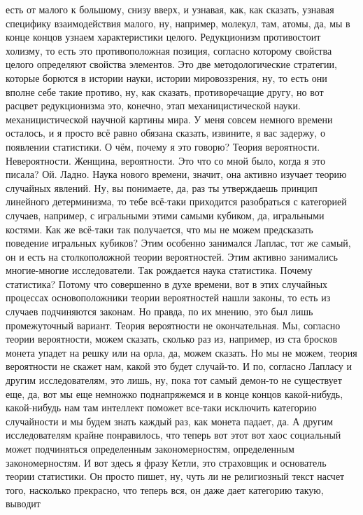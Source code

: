 есть от малого к большому, снизу вверх, и узнавая, как, как сказать, узнавая
специфику взаимодействия малого, ну, например, молекул, там, атомы, да, мы в
конце концов узнаем характеристики целого. Редукционизм противостоит холизму, то
есть это противоположная позиция, согласно которому свойства целого определяют
свойства элементов. Это две методологические стратегии, которые борются в
истории науки, истории мировоззрения, ну, то есть они вполне себе такие противо,
ну, как сказать, противоречащие другу, но вот расцвет редукционизма это,
конечно, этап механицистической науки. механицистической научной картины мира. У
меня совсем немного времени осталось, и я просто всё равно обязана сказать,
извините, я вас задержу, о появлении статистики. О чём, почему я это говорю?
Теория вероятности. Невероятности. Женщина, вероятности. Это что со мной было,
когда я это писала? Ой. Ладно. Наука нового времени, значит, она активно изучает
теорию случайных явлений. Ну, вы понимаете, да, раз ты утверждаешь принцип
линейного детерминизма, то тебе всё-таки приходится разобраться с категорией
случаев, например, с игральными этими самыми кубиком, да, игральными костями.
Как же всё-таки так получается, что мы не можем предсказать поведение игральных
кубиков? Этим особенно занимался Лаплас, тот же самый, он и есть на
столкоположной теории вероятностей. Этим активно занимались многие-многие
исследователи. Так рождается наука статистика. Почему статистика? Потому что
совершенно в духе времени, вот в этих случайных процессах основоположники теории
вероятностей нашли законы, то есть из случаев подчиняются законам. Но правда, по
их мнению, это был лишь промежуточный вариант. Теория вероятности не
окончательная. Мы, согласно теории вероятности, можем сказать, сколько раз из,
например, из ста бросков монета упадет на решку или на орла, да, можем сказать.
Но мы не можем, теория вероятности не скажет нам, какой это будет случай-то. И
по, согласно Лапласу и другим исследователям, это лишь, ну, пока тот самый
демон-то не существует еще, да, вот мы еще немножко поднапряжемся и в конце
концов какой-нибудь, какой-нибудь нам там интеллект поможет все-таки исключить
категорию случайности и мы будем знать каждый раз, как монета падает, да. А
другим исследователям крайне понравилось, что теперь вот этот вот хаос
социальный может подчиняться определенным закономерностям, определенным
закономерностям. И вот здесь я фразу Кетли, это страховщик и основатель теории
статистики. Он просто пишет, ну, чуть ли не религиозный текст насчет того,
насколько прекрасно, что теперь вся, он даже дает категорию такую, выводит
